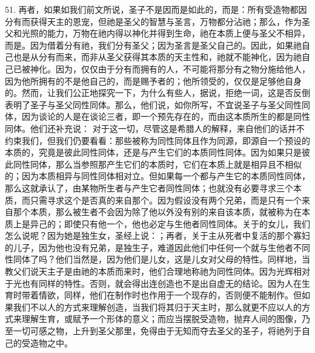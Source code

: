 51. 再者，如果如我们前文所说，圣子不是因而是如此的，而是：所有受造物都因分有而获得天主的恩宠，但祂是圣父的智慧与圣言，万物都分沾祂；那么，作为圣父和光照的能力，万物在祂内得以神化并得到生命，祂在本质上便与圣父不相异，而是。因为借着分有祂，我们分有圣父；因为圣言是圣父自己的。因此，如果祂自己也是从分有而来，而非从圣父获得其本质的天主性和，祂就不能神化，因为祂自己已被神化。因为，仅仅由于分有而拥有的人，不可能将那分有之物分施给他人，因为他所拥有的不是他自己的，而是赐予者的；他所领受的，仅仅是足够他自身的。然而，让我们公正地探究一下，为什么有些人，据说，拒绝一词，这是否反倒表明了圣子与圣父同性同体。那么，他们说，如你所写，不宜说圣子与圣父同性同体，因为谈论的人是在谈论三者，即一个预先存在的，而由这本质所生的都是同性同体。他们还补充说： 对于这一切，尽管这是希腊人的解释，来自他们的话并不约束我们，但我们仍要看看：那些被称为同性同体且作为同源，即源自一个预设的本质的，究竟是彼此同性同体，还是与产生它们的本质同性同体。因为如果只是彼此同性同体，那么当参照那产生它们的本质时，它们在本质上就是相异且不相似的；因为本质相异与同性同体相对立。但如果每一个都与产生它的本质同性同体，那么这就承认了，由某物所生者与产生它者同性同体；也就没有必要寻求三个本质，而只需寻求这个是否真的来自那个。因为假设没有两个兄弟，而是只有一个来自那个本质，那么被生者不会因为除了他以外没有别的来自该本质，就被称为在本质上是异己的；即使只有他一个，他也必定与生他者同性同体。关于的女儿，我们怎么说呢？因为她是独生女，圣经上说：；再者，关于主从死者中复活的那个寡妇的儿子，因为他也没有兄弟，是独生子，难道因此他们中任何一个就与生他者不同性同体了吗？他们当然是，因为他们是儿女，这是儿女对父母的特性。同样地，当教父们说天主子是由祂的本质而来时，他们合理地称祂为同性同体。因为光辉相对于光也有同样的特性。否则，就会得出连创造也不是出自虚无的结论。因为人在生育时带着情欲，同样，他们在制作时也作用于一个现存的，否则便不能制作。但如果我们不以人的方式来理解创造，当我们将其归于天主时，那么就更不应以人的方式来理解生育，或赋予一个形体的意义；而应当摆脱受造物，抛弃人间的图像，乃至一切可感之物，上升到圣父那里，免得由于无知而夺去圣父的圣子，将祂列于自己的受造物之中。\par

